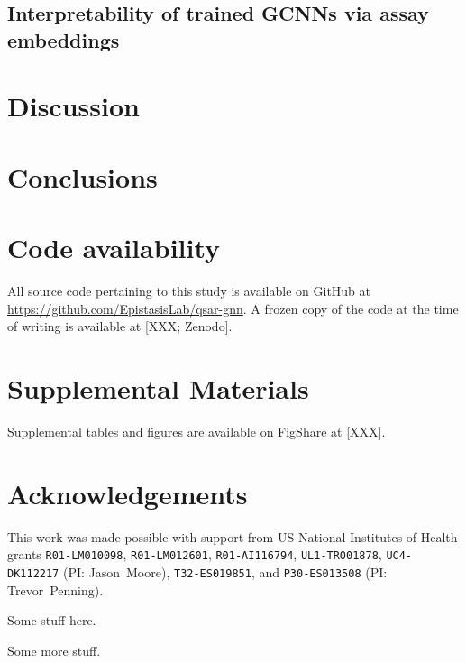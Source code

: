 \documentclass{ws-procs11x85}
\begin{document}
\subsection{Interpretability of trained GCNNs via assay embeddings}

\section{Discussion}

\section{Conclusions}

\section{Code availability}
All source code pertaining to this study is available on GitHub at \url{https://github.com/EpistasisLab/qsar-gnn}.
A frozen copy of the code at the time of writing is available at [XXX; Zenodo].

\section{Supplemental Materials}
Supplemental tables and figures are available on FigShare at [XXX].

\section*{Acknowledgements}
This work was made possible with support from US National Institutes of Health grants \texttt{R01-LM010098}, \texttt{R01-LM012601}, \texttt{R01-AI116794}, \texttt{UL1-TR001878}, \texttt{UC4-DK112217} (PI: Jason~Moore), \texttt{T32-ES019851}, and \texttt{P30-ES013508} (PI: Trevor~Penning).




\label{GCNN}
Some stuff here.

\label{NC}
Some more stuff.
\end{document}
